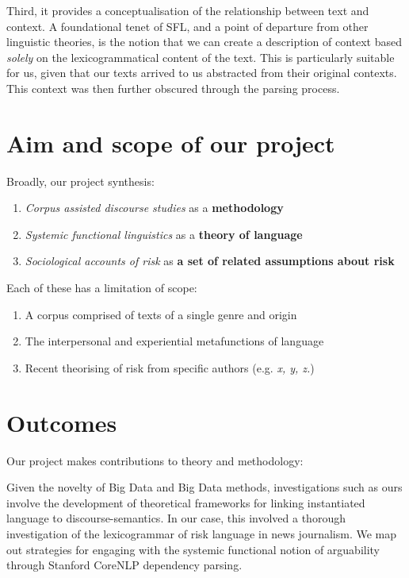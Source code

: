      Third, it provides a conceptualisation of the relationship between text and context. A foundational tenet of SFL, and a point of departure from other linguistic theories, is the notion that we can create a description of context based \emph{solely} on the lexicogrammatical content of the text. This is particularly suitable for us, given that our texts arrived to us abstracted from their original contexts. This context was then further obscured through the parsing process.


\section{Aim and scope of our project}

Broadly, our project synthesis:

\begin{enumerate}
    \item \emph{Corpus assisted discourse studies} as a \textbf{methodology}
    \item \emph{Systemic functional linguistics} as a \textbf{theory of language}
    \item \emph{Sociological accounts of risk} as \textbf{a set of related assumptions about risk}
\end{enumerate}

Each of these has a limitation of scope:

\begin{enumerate}
    \item A corpus comprised of texts of a single genre and origin
    \item The interpersonal and experiential metafunctions of language
    \item Recent theorising of risk from specific authors (e.g. \emph{x, y, z.})
\end{enumerate}

\section{Outcomes}

Our project makes contributions to theory and methodology: 



Given the novelty of Big Data and Big Data methods, investigations such as ours involve the development of theoretical frameworks for linking instantiated language to discourse-semantics. In our case, this involved a thorough investigation of the lexicogrammar of risk language in news journalism. We map out strategies for engaging with the systemic functional notion of arguability through Stanford CoreNLP dependency parsing.

